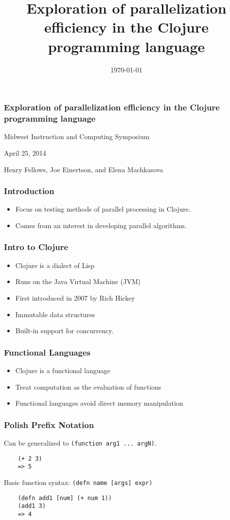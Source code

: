 \documentclass{beamer}
\newcommand{\clocode}[1]{{\texttt {#1}}}
\begin{document}
\title{Exploration of parallelization efficiency in the Clojure programming language}
\date{\today}

\begin{frame}
\frametitle{Exploration of parallelization efficiency in the Clojure programming language}
{\centering
Midwest Instruction and Computing Symposium\par
April 25, 2014\par
Henry Fellows, Joe Einertson, and Elena Machkasova\par
}
\end{frame}
\begin{frame}[fragile]
\frametitle{Introduction}
	\begin{itemize}
	\item Focus on testing methods of parallel processing in Clojure.
	\item Comes from an interest in developing parallel algorithms.
	\end{itemize}

\end{frame}
\begin{frame}[fragile]
\frametitle{Intro to Clojure}
	\begin{itemize}
  	 \item Clojure is a dialect of Lisp
	\item Runs on the Java Virtual Machine (JVM)
  	 \item First introduced in 2007 by Rich Hickey
  	 \item Immutable data structures
	 \item Built-in support for concurrency.
	 	\end{itemize}
\end{frame}
\begin{frame}[fragile]
\frametitle{Functional Languages}
	\begin{itemize}
	 \item Clojure is a functional language
  	 \item Treat computation as the evaluation of functions
  	 \item Functional languages avoid direct memory manipulation
       \end{itemize}
\end{frame}
\begin{frame}[fragile]
\frametitle{Polish Prefix Notation}
Can be generalized to \clocode{(function arg1 ... argN)}.
	\begin{verbatim}
	(+ 2 3)
	=> 5
	\end{verbatim}
Basic function syntax: \clocode{(defn name [args] expr)}
	\begin{verbatim}
	(defn add1 [num] (+ num 1))
	(add1 3)
	=> 4
	\end{verbatim}
\end{frame}
\end{document}
